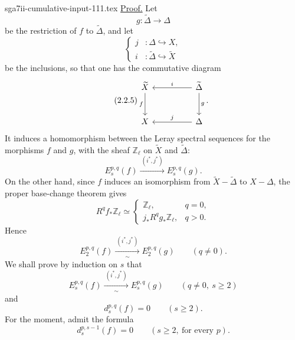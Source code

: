 \begin{filecontents*}{sga7ii-cumulative-input-111.tex}
\noindent\underline{Proof.}
Let
\begin{equation}\tag{2.2.3}
g:\widetilde\Delta\longrightarrow\Delta
\end{equation}
be the restriction of $f$ to $\widetilde\Delta$, and let
\begin{equation}\tag{2.2.4}
\left\{
\begin{aligned}
j&:\Delta\hookrightarrow X,\\
i&:\widetilde\Delta\hookrightarrow\widetilde X
\end{aligned}
\right.
\end{equation}
be the inclusions, so that one has the commutative diagram
\begin{equation}\tag{2.2.5}
\begin{tikzcd}[column sep=huge,row sep=large]
\widetilde X \arrow[d,"f"'] &
\widetilde\Delta \arrow[l,"i"'] \arrow[d,"g"]\\
X & \Delta \arrow[l,"j"']
\end{tikzcd}.
\end{equation}
It induces a homomorphism between the Leray spectral sequences for the
morphisms $f$ and $g$, with the sheaf $\mathbb Z_\ell$ on $\widetilde X$ and
$\widetilde\Delta$:
\begin{equation}\tag{2.2.6}
E_s^{p,q}(f)\xrightarrow{\ (i^*,j^*)\ }E_s^{p,q}(g).
\end{equation}
On the other hand, since $f$ induces an isomorphism from
$\widetilde X-\widetilde\Delta$ to $X-\Delta$, the proper base-change theorem
gives
\begin{equation}\tag{2.2.7}
R^qf_*\mathbb Z_\ell\simeq
\begin{cases}
\mathbb Z_\ell,&q=0,\\[1ex]
j_*R^qg_*\mathbb Z_\ell,&q>0.
\end{cases}
\end{equation}
Hence
\begin{equation}\tag{2.2.8}
E_2^{p,q}(f)
\xrightarrow[\ \sim\ ]{\ (i^*,j^*)\ }
E_2^{p,q}(g)
\qquad(q\ne0).
\end{equation}
We shall prove by induction on $s$ that
\begin{equation}\tag{2.2.9}
E_s^{p,q}(f)
\xrightarrow[\ \sim\ ]{\ (i^*,j^*)\ }
E_s^{p,q}(g)
\qquad(q\ne0,\ s\geq2)
\end{equation}
and
\begin{equation}\tag{2.2.10}
d_s^{p,q}(f)=0\qquad(s\geq2).
\end{equation}
For the moment, admit the formula
\begin{equation}\tag{2.2.11}
d_s^{p,s-1}(f)=0\qquad(s\geq2,\ \text{for every }p).
\end{equation}


\end{filecontents*}
